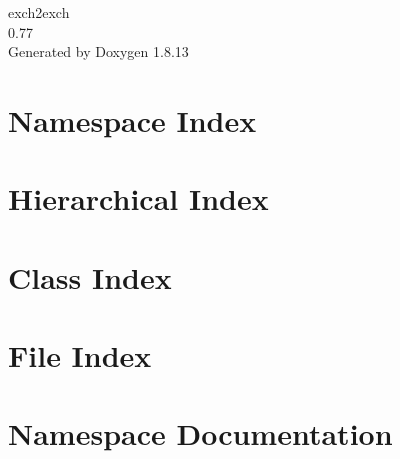 \documentclass[twoside]{book}
\newcommand{\+}{\discretionary{\mbox{\scriptsize$\hookleftarrow$}}{}{}}
\newcommand{\clearemptydoublepage}{%
  \newpage{\pagestyle{empty}\cleardoublepage}%
}
\begin{document}
\hypersetup{pageanchor=false,
             bookmarksnumbered=true,
             pdfencoding=unicode
            }
\begin{titlepage}
\vspace*{7cm}
\begin{center}%
{\Large exch2exch \\[1ex]\large 0.\+77 }\\
\vspace*{1cm}
{\large Generated by Doxygen 1.8.13}\\
\end{center}
\end{titlepage}
\clearemptydoublepage
{}
\tableofcontents
\clearemptydoublepage
{}
\hypersetup{pageanchor=true}

\chapter{Namespace Index}

\chapter{Hierarchical Index}

\chapter{Class Index}

\chapter{File Index}

\chapter{Namespace Documentation}









\end{document}

